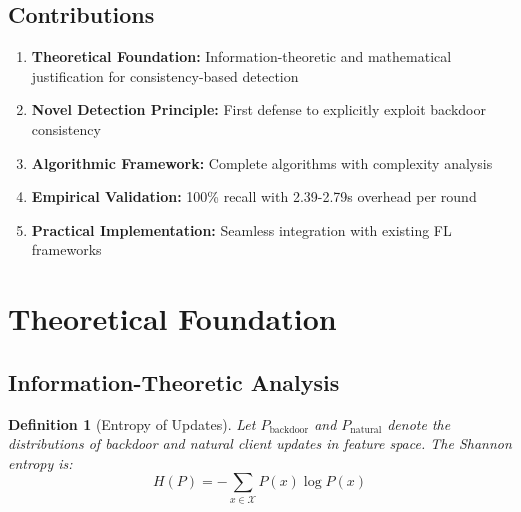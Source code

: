 \documentclass[11pt,a4paper]{article}
\newtheorem{definition}{Definition}
\begin{document}
\begin{center}
\end{center}

\subsection{Contributions}

\begin{enumerate}
    \item \textbf{Theoretical Foundation:} Information-theoretic and mathematical justification for consistency-based detection
    \item \textbf{Novel Detection Principle:} First defense to explicitly exploit backdoor consistency
    \item \textbf{Algorithmic Framework:} Complete algorithms with complexity analysis
    \item \textbf{Empirical Validation:} 100\% recall with 2.39-2.79s overhead per round
    \item \textbf{Practical Implementation:} Seamless integration with existing FL frameworks
\end{enumerate}

\section{Theoretical Foundation}

\subsection{Information-Theoretic Analysis}

\begin{definition}[Entropy of Updates]
Let $P_{\text{backdoor}}$ and $P_{\text{natural}}$ denote the distributions of backdoor and natural client updates in feature space. The Shannon entropy is:
\[
H(P) = -\sum_{x \in \mathcal{X}} P(x) \log P(x)
\]
\end{definition}
\end{document}
